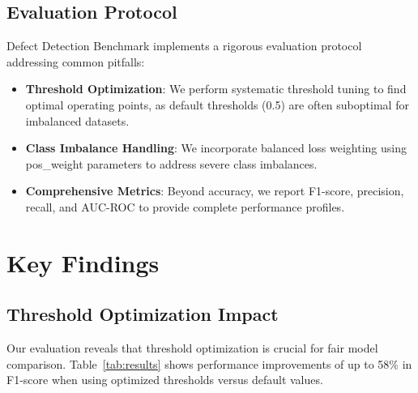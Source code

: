 \documentclass[letterpaper]{article}
\begin{document}
\subsection{Evaluation Protocol}
Defect Detection Benchmark implements a rigorous evaluation protocol addressing common pitfalls:

\begin{itemize}
	\item \textbf{Threshold Optimization}: We perform systematic threshold tuning to find optimal operating points, as default thresholds (0.5) are often suboptimal for imbalanced datasets.
	\item \textbf{Class Imbalance Handling}: We incorporate balanced loss weighting using pos\_weight parameters to address severe class imbalances.
	\item \textbf{Comprehensive Metrics}: Beyond accuracy, we report F1-score, precision, recall, and AUC-ROC to provide complete performance profiles.
\end{itemize}

\section{Key Findings}

\subsection{Threshold Optimization Impact}

Our evaluation reveals that threshold optimization is crucial for fair model comparison. Table~\ref{tab:results} shows performance improvements of up to 58\% in F1-score when using optimized thresholds versus default values.
\end{document}
